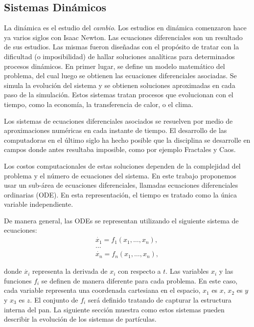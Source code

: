 \documentclass[oneside,a4paper,spanish,links]{amca}
\begin{document}
\subsection{Sistemas Din\'amicos}

La din\'amica es el estudio del {\em cambio}. Los estudios en din\'amica comenzaron hace ya va\-rios siglos con Isaac Newton. Las ecuaciones diferenciales son un resultado de sus estudios. Las mismas fueron dise\~nadas con el prop\'osito de tratar con la dificultad (o imposibilidad) de hallar soluciones anal\'iticas para determinados procesos din\'amicos. En primer lugar, se define un modelo matem\'atico del problema, del cual luego se obtienen 
las ecuaciones diferenciales asociadas. Se simula la evoluci\'on del sistema y se obtienen soluciones aproximadas en cada paso de la simulaci\'on. Estos sistemas tratan procesos que evolucionan con el tiempo, como la econom\'ia, la transferencia de calor, o el clima.

Los sistemas de ecuaciones diferenciales asociados se resuelven por medio de aproximaciones num\'ericas en cada instante de tiempo. El desarrollo de las computadoras en el \'ultimo siglo ha hecho posible que la disciplina se desarrolle en campos donde antes resultaba imposible, como por ejemplo Fractales \citep{Mandelbrot83} y Caos.

Los costos computacionales de estas soluciones dependen de la complejidad del problema y el n\'umero de ecuaciones del sistema. En este trabajo proponemos usar un sub-\'area de ecuaciones diferenciales, llamadas ecuaciones diferenciales ordinarias (ODE). En esta representaci\'on, el tiempo es tratado como la \'unica variable independiente.


De manera general, las ODEs se representan utilizando el siguiente sistema de ecuaciones:
\begin{equation} \label{eq:simple}  
  \begin{aligned}
    \dot{x_{1}} = f_{1}(x_{1},\ldots,x_{n}),\\
    \ldots\\
    \dot{x_{n}} = f_{n}(x_{1},\ldots,x_{n}),
  \end{aligned}
\end{equation}

\noindent donde $\dot{x_{i}}$ representa la derivada de $x_{i}$ con respecto
a $t$. Las variables $x_{i}$ y las funciones $f_{i}$ se definen de manera diferente para cada problema. En este caso, cada variable representa una coordenada cartesiana en el espacio, $x_{1}$ es $x$, $x_{2}$ es $y$ y $x_{3}$ es $z$. El conjunto de $f_{i}$ ser\'a definido tratando de capturar la estructura interna del pan. La siguiente secci\'on muestra como estos sistemas pueden describir la evoluci\'on de los sistemas de part\'iculas.
\end{document}
